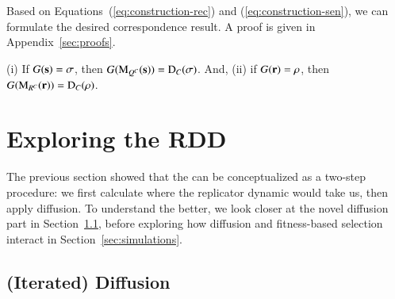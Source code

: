 \documentclass[fleqn,reqno,10pt]{article}
\renewcommand{\Smixed}{\ensuremath{\mathrm{\mathbf{s}}}}
\renewcommand{\Rmixed}{\ensuremath{\mathrm{\mathbf{r}}}}
\newcommand{\rdd}{\acro{rdd}} %
\newcommand{\Diff}{\ensuremath{\mathrm{D}}} %
\newcommand{\Mutate}{\ensuremath{\mathrm{M}}} %
\begin{document}
Based on Equations~(\ref{eq:construction-rec}) and
(\ref{eq:construction-sen}), we can formulate the desired
correspondence result. A proof is given in Appendix~\ref{sec:proofs}.

\begin{theorem}
  \label{thm:Correspondence}
  (i) If $G(\Smixed) = \Sstrat$, then $G(\Mutate_{Q^C}(\Smixed)) =
  \Diff_C(\Sstrat)$. And, (ii) if $G(\Rmixed) = \Rstrat$, then
  $G(\Mutate_{R^C}(\Rmixed)) = \Diff_C(\Rstrat)$.
\end{theorem}



\section{Exploring the RDD}
\label{sec:exploring-rdd}

The previous section showed that the \rdd can be conceptualized as a
two-step procedure: we first calculate where the replicator dynamic
would take us, then apply diffusion. To understand the \rdd better, we
look closer at the novel diffusion part in
Section~\ref{sec:iterated-diffusion}, before exploring how diffusion
and fitness-based selection interact in Section~\ref{sec:simulations}.

\subsection{(Iterated) Diffusion}
\label{sec:iterated-diffusion}
\end{document}

